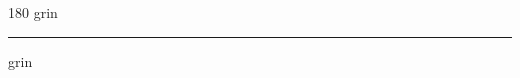 
\begin{frame}
\begin{center}
\begin{turn}{180}
{\fontsize{2.5cm}{1em}\selectfont grin}
\end{turn}
\vspace{1em}\par  
\hrule
\vspace{1em}\par  
{\fontsize{2.5cm}{1em}\selectfont grin}
\end{center}
\end{frame}
